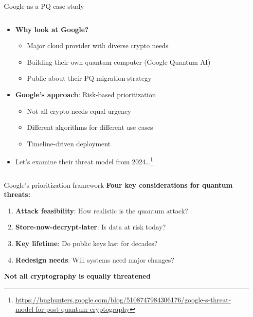 \documentclass[aspectratio=169, lualatex, handout]{beamer}
\begin{document}
\begin{frame}{Google as a PQ case study}
	\begin{columns}[c]
		\begin{column}{1\textwidth}
			\begin{itemize}
				\item \textbf{Why look at Google?}
				      \begin{itemize}
					      \item Major cloud provider with diverse crypto needs
					      \item Building their own quantum computer (Google Quantum AI)
					      \item Public about their PQ migration strategy
				      \end{itemize}
				\item \textbf{Google's approach}: Risk-based prioritization
				      \begin{itemize}
					      \item Not all crypto needs equal urgency
					      \item Different algorithms for different use cases
					      \item Timeline-driven deployment
				      \end{itemize}
				\item Let's examine their threat model from 2024\ldots\footnote{\url{https://bughunters.google.com/blog/5108747984306176/google-s-threat-model-for-post-quantum-cryptography}}
			\end{itemize}
		\end{column}
	\end{columns}
\end{frame}

\begin{frame}{Google's prioritization framework}
	\textbf{Four key considerations for quantum threats:}
	\begin{enumerate}
		\item \textbf{Attack feasibility}: How realistic is the quantum attack?
		\item \textbf{Store-now-decrypt-later}: Is data at risk today?
		\item \textbf{Key lifetime}: Do public keys last for decades?
		\item \textbf{Redesign needs}: Will systems need major changes?
	\end{enumerate}
	\vspace{5mm}
	\begin{center}
		\textbf{Not all cryptography is equally threatened}
	\end{center}
\end{frame}
\end{document}
